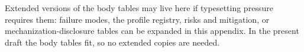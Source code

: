 \documentclass[11pt]{article}
\theoremstyle{definition}
\begin{document}
Extended versions of the body tables may live here if typesetting pressure
requires them: failure modes, the profile registry, risks and mitigation, or
mechanization-disclosure tables can be expanded in this appendix.  In the
present draft the body tables fit, so no extended copies are needed.
 
\clearpage


\end{document}
